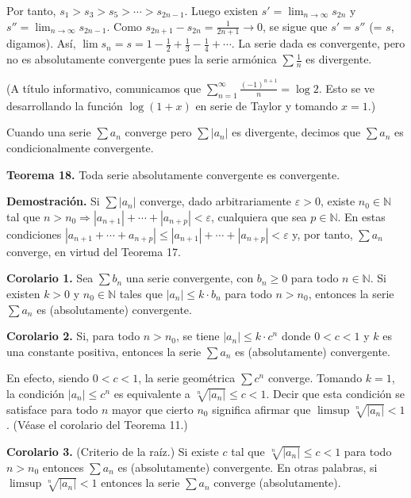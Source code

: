 \documentclass[12pt,oneside]{book}
\begin{document}
Por tanto, \(s_1 > s_3 > s_5 > \cdots > s_{2n-1}\). Luego existen \(s' = \lim_{n \to \infty} s_{2n}\) y \(s'' = \lim_{n \to \infty} s_{2n-1}\). Como \(s_{2n+1} - s_{2n} = \frac{1}{2n+1} \to 0\), se sigue que \(s' = s''\) (= \(s\), digamos). Así, \(\lim s_n = s = 1 - \frac{1}{2} + \frac{1}{3} - \frac{1}{4} + \cdots\). La serie dada es convergente, pero no es absolutamente convergente pues la serie armónica \(\sum \frac{1}{n}\) es divergente.

(A título informativo, comunicamos que \(\sum_{n=1}^{\infty} \frac{(-1)^{n+1}}{n} = \log 2\). Esto se ve desarrollando la función \(\log(1+x)\) en serie de Taylor y tomando \(x=1\).)

Cuando una serie \(\sum a_n\) converge pero \(\sum |a_n|\) es divergente, decimos que \(\sum a_n\) es condicionalmente convergente.

\textbf{Teorema 18.} Toda serie absolutamente convergente es convergente.

\textbf{Demostración.} Si \(\sum |a_n|\) converge, dado arbitrariamente \(\varepsilon > 0\), existe \(n_0 \in \mathbb{N}\) tal que \(n > n_0 \Rightarrow |a_{n+1}| + \cdots + |a_{n+p}| < \varepsilon\), cualquiera que sea \(p \in \mathbb{N}\). En estas condiciones \(|a_{n+1} + \cdots + a_{n+p}| \leq |a_{n+1}| + \cdots + |a_{n+p}| < \varepsilon\) y, por tanto, \(\sum a_n\) converge, en virtud del Teorema 17.

\textbf{Corolario 1.} Sea \(\sum b_n\) una serie convergente, con \(b_n \geq 0\) para todo \(n \in \mathbb{N}\). Si existen \(k > 0\) y \(n_0 \in \mathbb{N}\) tales que \(|a_n| \leq k \cdot b_n\) para todo \(n > n_0\), entonces la serie \(\sum a_n\) es (absolutamente) convergente.

\textbf{Corolario 2.} Si, para todo \(n > n_0\), se tiene \(|a_n| \leq k \cdot c^n\) donde \(0 < c < 1\) y \(k\) es una constante positiva, entonces la serie \(\sum a_n\) es (absolutamente) convergente.

En efecto, siendo \(0 < c < 1\), la serie geométrica \(\sum c^n\) converge. Tomando \(k = 1\), la condición \(|a_n| \leq c^n\) es equivalente a \(\sqrt[n]{|a_n|} \leq c < 1\). Decir que esta condición se satisface para todo \(n\) mayor que cierto \(n_0\) significa afirmar que \(\limsup \sqrt[n]{|a_n|} < 1\). (Véase el corolario del Teorema 11.)

\textbf{Corolario 3.} (Criterio de la raíz.) Si existe \(c\) tal que \(\sqrt[n]{|a_n|} \leq c < 1\) para todo \(n > n_0\) entonces \(\sum a_n\) es (absolutamente) convergente. En otras palabras, si \(\limsup \sqrt[n]{|a_n|} < 1\) entonces la serie \(\sum a_n\) converge (absolutamente).
\end{document}
